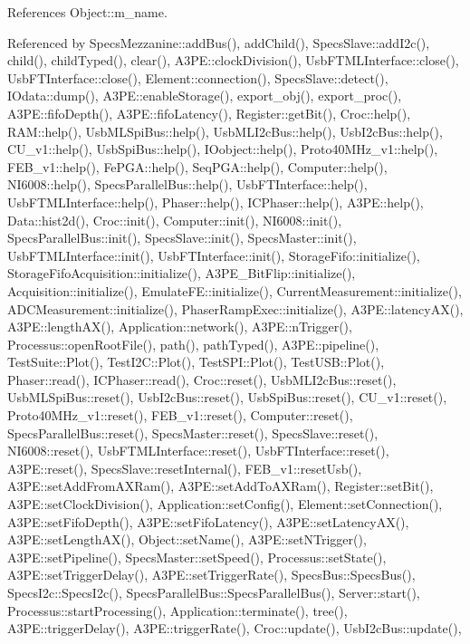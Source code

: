 References Object\+::m\+\_\+name.



Referenced by Specs\+Mezzanine\+::add\+Bus(), add\+Child(), Specs\+Slave\+::add\+I2c(), child(), child\+Typed(), clear(), A3\+P\+E\+::clock\+Division(), Usb\+F\+T\+M\+L\+Interface\+::close(), Usb\+F\+T\+Interface\+::close(), Element\+::connection(), Specs\+Slave\+::detect(), I\+Odata\+::dump(), A3\+P\+E\+::enable\+Storage(), export\+\_\+obj(), export\+\_\+proc(), A3\+P\+E\+::fifo\+Depth(), A3\+P\+E\+::fifo\+Latency(), Register\+::get\+Bit(), Croc\+::help(), R\+A\+M\+::help(), Usb\+M\+L\+Spi\+Bus\+::help(), Usb\+M\+L\+I2c\+Bus\+::help(), Usb\+I2c\+Bus\+::help(), C\+U\+\_\+v1\+::help(), Usb\+Spi\+Bus\+::help(), I\+Oobject\+::help(), Proto40\+M\+Hz\+\_\+v1\+::help(), F\+E\+B\+\_\+v1\+::help(), Fe\+P\+G\+A\+::help(), Seq\+P\+G\+A\+::help(), Computer\+::help(), N\+I6008\+::help(), Specs\+Parallel\+Bus\+::help(), Usb\+F\+T\+Interface\+::help(), Usb\+F\+T\+M\+L\+Interface\+::help(), Phaser\+::help(), I\+C\+Phaser\+::help(), A3\+P\+E\+::help(), Data\+::hist2d(), Croc\+::init(), Computer\+::init(), N\+I6008\+::init(), Specs\+Parallel\+Bus\+::init(), Specs\+Slave\+::init(), Specs\+Master\+::init(), Usb\+F\+T\+M\+L\+Interface\+::init(), Usb\+F\+T\+Interface\+::init(), Storage\+Fifo\+::initialize(), Storage\+Fifo\+Acquisition\+::initialize(), A3\+P\+E\+\_\+\+Bit\+Flip\+::initialize(), Acquisition\+::initialize(), Emulate\+F\+E\+::initialize(), Current\+Measurement\+::initialize(), A\+D\+C\+Measurement\+::initialize(), Phaser\+Ramp\+Exec\+::initialize(), A3\+P\+E\+::latency\+A\+X(), A3\+P\+E\+::length\+A\+X(), Application\+::network(), A3\+P\+E\+::n\+Trigger(), Processus\+::open\+Root\+File(), path(), path\+Typed(), A3\+P\+E\+::pipeline(), Test\+Suite\+::\+Plot(), Test\+I2\+C\+::\+Plot(), Test\+S\+P\+I\+::\+Plot(), Test\+U\+S\+B\+::\+Plot(), Phaser\+::read(), I\+C\+Phaser\+::read(), Croc\+::reset(), Usb\+M\+L\+I2c\+Bus\+::reset(), Usb\+M\+L\+Spi\+Bus\+::reset(), Usb\+I2c\+Bus\+::reset(), Usb\+Spi\+Bus\+::reset(), C\+U\+\_\+v1\+::reset(), Proto40\+M\+Hz\+\_\+v1\+::reset(), F\+E\+B\+\_\+v1\+::reset(), Computer\+::reset(), Specs\+Parallel\+Bus\+::reset(), Specs\+Master\+::reset(), Specs\+Slave\+::reset(), N\+I6008\+::reset(), Usb\+F\+T\+M\+L\+Interface\+::reset(), Usb\+F\+T\+Interface\+::reset(), A3\+P\+E\+::reset(), Specs\+Slave\+::reset\+Internal(), F\+E\+B\+\_\+v1\+::reset\+Usb(), A3\+P\+E\+::set\+Add\+From\+A\+X\+Ram(), A3\+P\+E\+::set\+Add\+To\+A\+X\+Ram(), Register\+::set\+Bit(), A3\+P\+E\+::set\+Clock\+Division(), Application\+::set\+Config(), Element\+::set\+Connection(), A3\+P\+E\+::set\+Fifo\+Depth(), A3\+P\+E\+::set\+Fifo\+Latency(), A3\+P\+E\+::set\+Latency\+A\+X(), A3\+P\+E\+::set\+Length\+A\+X(), Object\+::set\+Name(), A3\+P\+E\+::set\+N\+Trigger(), A3\+P\+E\+::set\+Pipeline(), Specs\+Master\+::set\+Speed(), Processus\+::set\+State(), A3\+P\+E\+::set\+Trigger\+Delay(), A3\+P\+E\+::set\+Trigger\+Rate(), Specs\+Bus\+::\+Specs\+Bus(), Specs\+I2c\+::\+Specs\+I2c(), Specs\+Parallel\+Bus\+::\+Specs\+Parallel\+Bus(), Server\+::start(), Processus\+::start\+Processing(), Application\+::terminate(), tree(), A3\+P\+E\+::trigger\+Delay(), A3\+P\+E\+::trigger\+Rate(), Croc\+::update(), Usb\+I2c\+Bus\+::update(), 